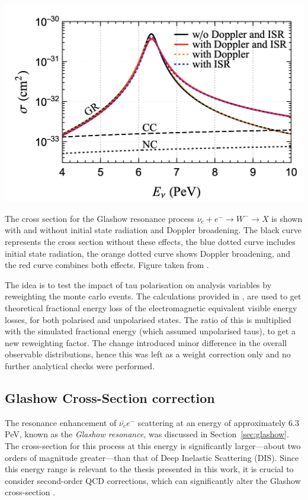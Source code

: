 \begin{marginfigure}
	\includegraphics{./figures/EventSample/ISR_glashow.png}
	\caption{The cross section for the Glashow resonance process \(\nu_e +e^- \to W^- \to X\) is shown with and without initial state radiation and Doppler broadening. The black curve represents the cross section without these effects, the blue dotted curve includes initial state radiation, the orange dotted curve shows Doppler broadening, and the red curve combines both effects. Figure taken from \cite{glashow_correcttion1}.}
\end{marginfigure}

The idea is to test the impact of tau polarisation on analysis variables by reweighting the monte carlo events. The calculations provided in \cite{Tau_Polarisation}, are used to get theoretical fractional energy loss of the electromagnetic equivalent visible energy losses, for both polarised and unpolarised states. The ratio of this is multiplied with the simulated fractional energy (which assumed unpolarised taus), to get a new reweighting factor. The change introduced minor difference in the overall observable distributions, hence this was left as a weight correction only and no further analytical checks were performed.


\subsection{Glashow Cross-Section correction}
\label{sec:glashow_correction}
The resonance enhancement of \(\bar{\nu_e}e^-\) scattering at an energy of approximately 6.3 PeV, known as the \emph{Glashow resonance}, was discussed in Section~\ref{sec:glashow}. The cross-section for this process at this energy is significantly larger—about two orders of magnitude greater—than that of Deep Inelastic Scattering (DIS). Since this energy range is relevant to the thesis presented in this work, it is crucial to consider second-order QCD corrections, which can significantly alter the Glashow cross-section .


